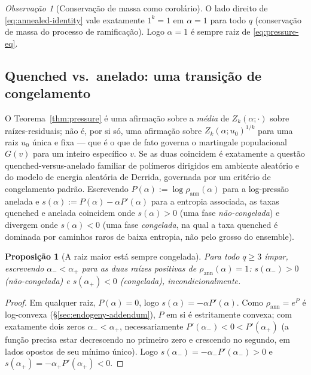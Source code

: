 \documentclass[11pt]{article}
\newtheorem{proposition}[theorem]{Proposição}
\theoremstyle{definition}
\theoremstyle{remark}
\newtheorem{remark}[theorem]{Observação}
\begin{document}
\begin{remark}[Conservação de massa como corolário]
O lado direito de \eqref{eq:annealed-identity} vale exatamente $1^k=1$
em $\alpha=1$ para todo $q$ (conservação de massa do processo de
ramificação). Logo $\alpha=1$ é sempre raiz de \eqref{eq:pressure-eq}.
\end{remark}

\subsection{Quenched vs.\ anelado: uma transição de congelamento}
\label{sec:freezing}

O Teorema~\ref{thm:pressure} é uma afirmação sobre a \emph{média} de
$Z_k(\alpha;\cdot)$ sobre raízes-residuais; não é, por si só, uma
afirmação sobre $Z_k(\alpha;u_0)^{1/k}$ para uma raiz $u_0$ única e
fixa --- que é o que de fato governa o martingale populacional $G(v)$
para um inteiro específico $v$. Se as duas coincidem é exatamente a
questão quenched-versus-anelado familiar de polímeros dirigidos em
ambiente aleatório e do modelo de energia aleatória de Derrida,
governada por um critério de congelamento padrão. Escrevendo
$P(\alpha):=\log\rho_{\mathrm{ann}}(\alpha)$ para a log-pressão anelada
e $s(\alpha):=P(\alpha)-\alpha P'(\alpha)$ para a entropia associada, as
taxas quenched e anelada coincidem onde $s(\alpha)>0$ (uma fase
\emph{não-congelada}) e divergem onde $s(\alpha)<0$ (uma fase
\emph{congelada}, na qual a taxa quenched é dominada por caminhos raros
de baixa entropia, não pelo grosso do ensemble).

\begin{proposition}[A raiz maior está sempre congelada]\label{prop:always-frozen}
Para todo $q\ge3$ ímpar, escrevendo $\alpha_-<\alpha_+$ para as duas
raízes positivas de $\rho_{\mathrm{ann}}(\alpha)=1$: $s(\alpha_-)>0$
(não-congelada) e $s(\alpha_+)<0$ (congelada), incondicionalmente.
\end{proposition}
\begin{proof}
Em qualquer raiz, $P(\alpha)=0$, logo $s(\alpha)=-\alpha P'(\alpha)$.
Como $\rho_{\mathrm{ann}}=e^P$ é log-convexa (\S\ref{sec:endogeny-addendum}),
$P$ em si é estritamente convexa; com exatamente dois zeros
$\alpha_-<\alpha_+$, necessariamente $P'(\alpha_-)<0<P'(\alpha_+)$ (a
função precisa estar decrescendo no primeiro zero e crescendo no
segundo, em lados opostos de seu mínimo único). Logo
$s(\alpha_-)=-\alpha_-P'(\alpha_-)>0$ e
$s(\alpha_+)=-\alpha_+P'(\alpha_+)<0$.
\end{proof}
\end{document}
